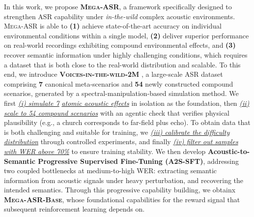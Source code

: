 \documentclass{article}
\begin{document}
In this work, we propose \textbf{\textsc{Mega-ASR}}, a framework specifically designed to strengthen ASR capability under \textit{in-the-wild} complex acoustic environments. \textsc{Mega-ASR} is able to \textbf{(1)} achieve state-of-the-art accuracy on individual environmental conditions within a single model, \textbf{(2)} deliver superior performance on real-world recordings exhibiting compound environmental effects, and \textbf{(3)} recover semantic information under highly challenging conditions, which requires a dataset that is both close to the real-world distribution and scalable. To this end, we introduce \textbf{\textsc{ \textsc{Voices-in-the-wild-2M} }}, a large-scale ASR dataset comprising \textbf{7} canonical meta-scenarios and \textbf{54} newly constructed compound scenarios, generated by a spectral-manipulation-based simulation method. We first  \underline{\textit{(i) simulate 7}} \underline{\textit{atomic acoustic effects}} in isolation as the foundation, then \underline{\textit{(ii) scale to 54 compound scenarios}} with an agentic check that verifies physical plausibility (e.g., a church corresponds to far-field plus echo).  To obtain data that is both challenging and suitable for training, we \underline{\textit{(iii) calibrate the difficulty}} \underline{\textit{distribution}} through controlled experiments, and finally \underline{\textit{(iv) filter out samples with WER above 70\%}} to ensure training stability. We then develop \textbf{Acoustic-to-Semantic Progressive Supervised Fine-Tuning (A2S-SFT)}, addressing two coupled bottlenecks at medium-to-high WER: extracting semantic information from acoustic signals under heavy perturbation, and recovering the intended semantics. Through this progressive capability building, we obtainx \textbf{\textsc{Mega-ASR-Base}}, whose foundational capabilities for the reward signal that subsequent reinforcement learning depends on.
\end{document}
